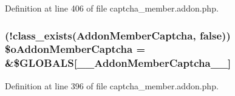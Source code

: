Definition at line 406 of file captcha\+\_\+member.\+addon.\+php.

\subsubsection[{\texorpdfstring{\$o\+Addon\+Member\+Captcha}{$oAddonMemberCaptcha}}]{ (!class\+\_\+exists(\textquotesingle{}Addon\+Member\+Captcha\textquotesingle{}, false)) \$o\+Addon\+Member\+Captcha = \&\$G\+L\+O\+B\+A\+LS\mbox{[}\textquotesingle{}\+\_\+\+\_\+\+Addon\+Member\+Captcha\+\_\+\+\_\+\textquotesingle{}\mbox{]}}\hypertarget{captcha__member_8addon_8php_a31cda8178bc3156a0f1ea23c851844dd}{}\label{captcha__member_8addon_8php_a31cda8178bc3156a0f1ea23c851844dd}


Definition at line 396 of file captcha\+\_\+member.\+addon.\+php.


